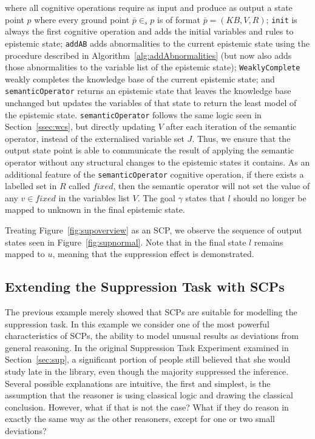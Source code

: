 \documentclass[
11pt, %
english, %
singlespacing, %
headsepline, %
]{MastersDoctoralThesis} %
\begin{document}
where all cognitive operations require as input and produce as output a state point $p$ where every ground point $\bar{p} \in_s p$ is of format $\bar{p}=(KB,V,R)$; \texttt{init} is always the first cognitive operation and adds the initial variables and rules to epistemic state; \texttt{addAB} adds abnormalities to the current epistemic state using the procedure described in Algorithm~\ref{alg:addAbnormalities} (but now also adds those abnormalities to the variable list of the epistemic state); \texttt{WeaklyComplete} weakly completes the knowledge base of the current epistemic state; and \texttt{semanticOperator} returns an epistemic state that leaves the knowledge base unchanged but updates the variables of that state to return the least model of the epistemic state. \texttt{semanticOperator} follows the same logic seen in Section~\ref{ssec:wcs}, but directly updating $V$ after each iteration of the semantic operator, instead of the externalised variable set $J$. Thus, we ensure that the output state point is able to communicate the result of applying the semantic operator without any structural changes to the epistemic states it contains. As an additional feature of the \texttt{semanticOperator} cognitive operation, if there exists a labelled set in $R$ called $fixed$, then the semantic operator will not set the value of any $v \in fixed$ in the variables list $V$. The goal $\gamma$ states that $l$ should no longer be mapped to unknown in the final epistemic state.



Treating Figure~\ref{fig:supoverview} as an SCP, we observe the sequence of output states seen in Figure~\ref{fig:supnormal}. Note that in the final state $l$ remains mapped to $u$, meaning that the suppression effect is demonstrated.

\subsection{Extending the Suppression Task with SCPs}
The previous example merely showed that SCPs are suitable for modelling the suppression task. In this example we consider one of the most powerful characteristics of SCPs, the ability to model unusual results as deviations from general reasoning. In the original Suppression Task Experiment examined in Section~\ref{sec:sup}, a significant portion of people still believed that she would study late in the library, even though the majority suppressed the inference. Several possible explanations are intuitive, the first and simplest, is the assumption that the reasoner is using classical logic and drawing the classical conclusion. However, what if that is not the case? What if they do reason in exactly the same way as the other reasoners, except for one or two small deviations?
\end{document}
